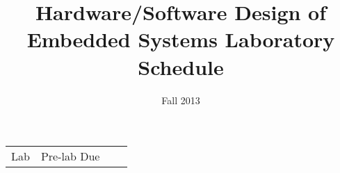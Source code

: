 \documentclass[11pt]{article} %
\title{Hardware/Software Design of Embedded Systems Laboratory Schedule}
\date{Fall 2013} %
\begin{document}
\maketitle

\begin{center}
    \begin{tabular}{ | c | c | c | c |}
    \hline
	Lab & Pre-lab Due &     

    \end{tabular}
\end{center}
\end{document}
